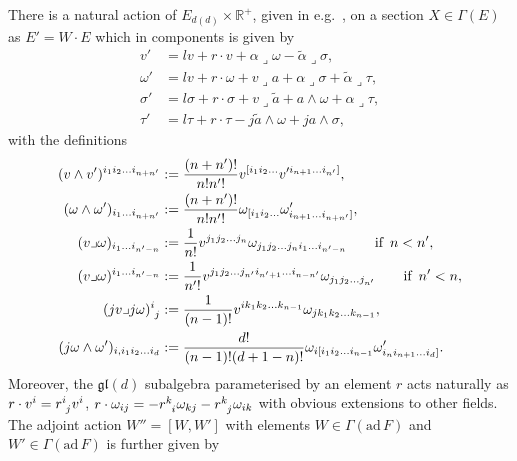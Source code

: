 There is a natural action of $E_{d(d)}\times\mathbb{R}^+$, given in e.g.\ \cite{Ashmore:2015joa}, on a section $X\in\Gamma(E)$ as $E' = W\cdot E$ which in components is given by 
\begin{equation}
    \begin{aligned}
        v'&= lv+r\cdot v+\alpha\lrcorner\omega-\tilde{\alpha}\lrcorner\sigma,\\
        \omega'&=lv+r\cdot \omega+v\lrcorner a+\alpha\lrcorner\sigma+\tilde{\alpha}\lrcorner\tau,\\
        \sigma'&= l\sigma+r\cdot \sigma+v\lrcorner\tilde{a}+a\wedge\omega+\alpha\lrcorner\tau,\\
        \tau'&= l\tau+r\cdot\tau-j\tilde{a}\wedge\omega+ja\wedge\sigma,
    \end{aligned}
\end{equation}
with the definitions 
\begin{equation}
    \begin{aligned}
        (v\wedge v')^{i_1i_2\ldots i_{n+n'}} &:= \frac{(n+n')!}{n!n'!}v^{[i_1i_2\ldots}v'^{i_{n+1}\ldots i_{n'}]},\\
        (\omega\wedge\omega')_{i_1\ldots i_{n+n'}} &:= \frac{(n+n')!}{n!n'!}\omega_{[i_1i_2\ldots}\omega'_{i_{n+1}\ldots i_{n+n'}]},\\
        (v\lrcorner\omega)_{i_1\ldots i_{n'-n}} &:= \frac{1}{n!}v^{j_1j_2\ldots j_n}\omega_{j_1j_2\ldots j_ni_{1}\ldots i_{n'-n}} \qquad \text{if }\, n<n',\\
        (v\lrcorner\omega)^{i_1\ldots i_{n'-n}} &:= \frac{1}{n'!}v^{j_1j_2\ldots j_{n'}i_{n'+1}\ldots i_{n-n'}}\omega_{j_1j_2\ldots j_{n'}} \qquad \text{if }\, n'<n,\\
        (jv\lrcorner j\omega)\tensor{}{^i_j}&:= \frac{1}{(n-1)!}v^{ik_1k_2\ldots k_{n-1}}\omega_{jk_1k_2\ldots k_{n-1}},\\
        (j\omega\wedge\omega')_{i,i_1i_2\ldots i_{d}} &:= \frac{d!}{(n-1)!(d+1-n)!}\omega_{i[i_1i_2\ldots i_{n-1}}\omega'_{i_ni_{n+1}\ldots i_d]}.
    \end{aligned}
\end{equation}
Moreover, the $\mathfrak{gl}(d)$ subalgebra parameterised by an element $r$ acts naturally as $r\cdot v^i=\tensor{r}{^i_j}v^i$, $r\cdot\omega_{ij}=-\tensor{r}{^k_i}\omega_{kj}-\tensor{r}{^k_j}\omega_{ik}$ with obvious extensions to other fields. The adjoint action $W''=[W,W']$ with elements  $W\in\Gamma(\text{ad}\,F)$ and $W'\in\Gamma(\text{ad}\,F)$ is further given by 
